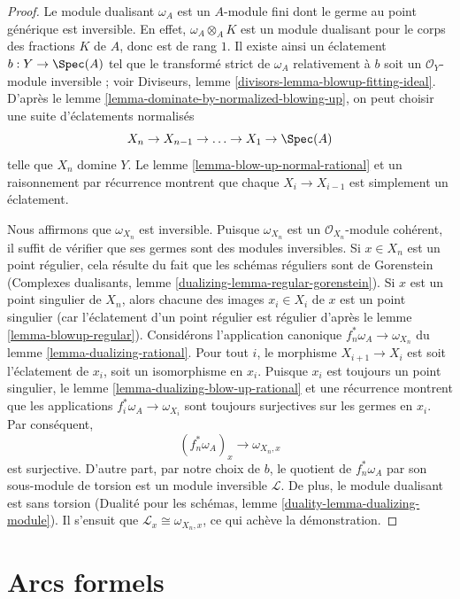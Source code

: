 \begin{proof} Le module dualisant $\omega_A$ est un $A$-module fini dont le germe au point générique est inversible. En effet, $\omega_A \otimes_A K$ est un module dualisant pour le corps des fractions $K$ de $A$, donc est de rang $1$. Il existe ainsi un éclatement $b : Y \to \Spec(A)$ tel que le transformé strict de $\omega_A$ relativement à $b$ soit un $\mathcal{O}_Y$-module inversible ; voir Diviseurs, lemme \ref{divisors-lemma-blowup-fitting-ideal}. D'après le lemme \ref{lemma-dominate-by-normalized-blowing-up}, on peut choisir une suite d'éclatements normalisés $$
X_n \to X_{n - 1} \to \ldots \to X_1 \to \Spec(A)
$$ telle que $X_n$ domine $Y$. Le lemme \ref{lemma-blow-up-normal-rational} et un raisonnement par récurrence montrent que chaque $X_i \to X_{i - 1}$ est simplement un éclatement.

\medskip\noindent Nous affirmons que $\omega_{X_n}$ est inversible. Puisque $\omega_{X_n}$ est un $\mathcal{O}_{X_n}$-module cohérent, il suffit de vérifier que ses germes sont des modules inversibles. Si $x \in X_n$ est un point régulier, cela résulte du fait que les schémas réguliers sont de Gorenstein (Complexes dualisants, lemme \ref{dualizing-lemma-regular-gorenstein}). Si $x$ est un point singulier de $X_n$, alors chacune des images $x_i \in X_i$ de $x$ est un point singulier (car l'éclatement d'un point régulier est régulier d'après le lemme \ref{lemma-blowup-regular}). Considérons l'application canonique $f_n^*\omega_A \to \omega_{X_n}$ du lemme \ref{lemma-dualizing-rational}. Pour tout $i$, le morphisme $X_{i + 1} \to X_i$ est soit l'éclatement de $x_i$, soit un isomorphisme en $x_i$. Puisque $x_i$ est toujours un point singulier, le lemme \ref{lemma-dualizing-blow-up-rational} et une récurrence montrent que les applications $f_i^*\omega_A \to \omega_{X_i}$ sont toujours surjectives sur les germes en $x_i$. Par conséquent, $$
(f_n^*\omega_A)_x \longrightarrow \omega_{X_n, x}
$$ est surjective. D'autre part, par notre choix de $b$, le quotient de $f_n^*\omega_A$ par son sous-module de torsion est un module inversible $\mathcal{L}$. De plus, le module dualisant est sans torsion (Dualité pour les schémas, lemme \ref{duality-lemma-dualizing-module}). Il s'ensuit que $\mathcal{L}_x \cong  \omega_{X_n, x}$, ce qui achève la démonstration. \end{proof}






\section{Arcs formels} \label{section-arcs}

